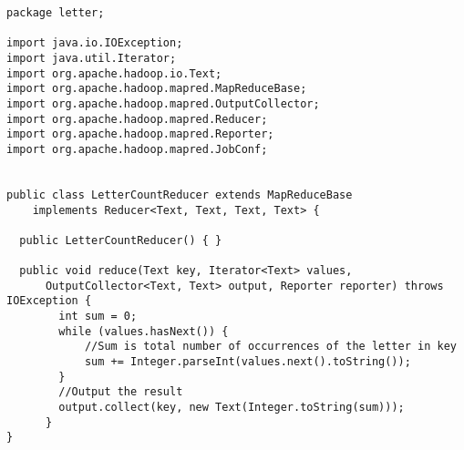 \documentclass[10pt, a4paper]{article}
\begin{document}
\begin{lstlisting}
package letter;

import java.io.IOException;
import java.util.Iterator;
import org.apache.hadoop.io.Text;
import org.apache.hadoop.mapred.MapReduceBase;
import org.apache.hadoop.mapred.OutputCollector;
import org.apache.hadoop.mapred.Reducer;
import org.apache.hadoop.mapred.Reporter;
import org.apache.hadoop.mapred.JobConf;


public class LetterCountReducer extends MapReduceBase
    implements Reducer<Text, Text, Text, Text> {

  public LetterCountReducer() { }

  public void reduce(Text key, Iterator<Text> values,
      OutputCollector<Text, Text> output, Reporter reporter) throws IOException {
	  	int sum = 0;
	    while (values.hasNext()) {
	    	//Sum is total number of occurrences of the letter in key
	    	sum += Integer.parseInt(values.next().toString());
	    }
	    //Output the result
	    output.collect(key, new Text(Integer.toString(sum)));
	  }
}
\end{lstlisting}

\end{document}
